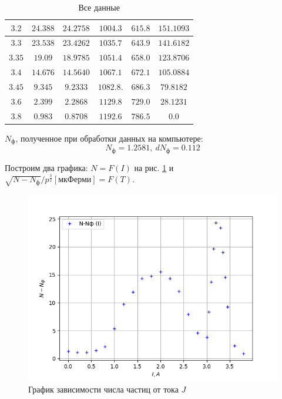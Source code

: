 \documentclass[a4paper, 12pt]{article}%
\begin{document}
\begin{table}[!h]
\begin{tabular}{|c|c|c|c|c|c|}
\hline $3.2$ & $24.388$ & $24.2758$ & $1004.3$ & $615.8$ & $151.1093$ \\
\hline $3.3$ & $23.538$ & $23.4262$ & $1035.7$ & $643.9$ & $141.6182$ \\
\hline $3.35$ & $19.09$ & $18.9785$ & $1051.4$ & $658.0$ & $123.8706$ \\
\hline $3.4$ & $14.676$ & $14.5640$ & $1067.1$ & $672.1$ & $105.0884$ \\
\hline $3.45$ & $9.345$ & $9.2333$ & $1082.8$. & $686.3$ & $79.8182$ \\
\hline $3.6$ & $2.399$ & $2.2868$ & $1129.8$ & $729.0$ & $28.1231$ \\
\hline $3.8$ & $0.983$ & $0.8708$ & $1192.6$ & $786.5$ & $0.0$ \\
\hline
\end{tabular}
	\caption{Все данные}
	\label{tab:raw}
\end{table}

\newpage

	$N_{\text{ф}}$, полученное при обработки данных на компьютере:
	\[N_{\text{ф}} = 1.2581,\ dN_{\text{ф}} = 0.112\]
	
	Построим два графика: $ N = F(I) $ на рис. \ref{fig:graph1} и $ \sqrt{N - N_\text{ф}}/p^{\frac{3}{2}}\left[\text{мкФерми}\right] = F(T) $.
	
	\begin{figure}[!h]
		\centering
		\includegraphics[width=0.9\linewidth]{1.png}
		\caption{График зависимости числа частиц от тока $J$}
		\label{fig:graph1}
	\end{figure}
	
\end{document}
